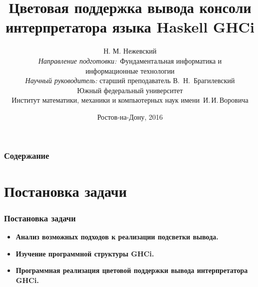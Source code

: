 \documentclass[utf8,russian]{beamer}
\title{\small{Цветовая поддержка вывода консоли интерпретатора языка Haskell GHCi}}
\author{\small{%
Н. М. Нежевский\\%
\emph{Направление подготовки:}~Фундаментальная информатика и \\информационные технологии\\%
\emph{Научный руководитель:} старший преподаватель В.~Н.~Брагилевский}\\%
\vspace{15pt}%
    Южный федеральный университет\\
    Институт математики, механики и компьютерных наук
    имени~И.\,И.\,Воровича%
}
\date{\small{Ростов-на-Дону, 2016}}
\begin{document}
\begin{frame}
\titlepage
\end{frame}

\begin{frame}
\frametitle{Содержание}
\tableofcontents
\end{frame}

\section{Постановка задачи}
\begin{frame}
\frametitle{Постановка задачи}
\begin{itemize}
  \item \textbf{Анализ возможных подходов к реализации подсветки вывода.}
  \item \textbf{Изучение программной структуры GHCi.}
  \item \textbf{Программная реализация цветовой поддержки вывода интерпретатора GHCi.} 
\end{itemize}
\end{frame}
\end{document}
